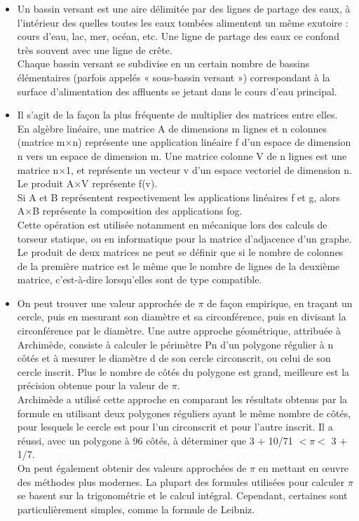 \begin{itemize}

	\item Un bassin versant\cite{ref17} est une aire délimitée par des lignes de partage des eaux, à l'intérieur des quelles toutes les eaux tombées alimentent un même exutoire : cours d'eau, lac, mer, océan, etc. Une ligne de partage des eaux ce confond très souvent avec une ligne de crête.\\

	Chaque bassin versant se subdivise en un certain nombre de bassins élémentaires (parfois appelés « sous-bassin versant ») correspondant à la surface d'alimentation des affluents se jetant dans le cours d'eau principal.\\

	\item Il s'agit de la façon la plus fréquente de multiplier des matrices\cite{ref18} entre elles.\\
	En algèbre linéaire, une matrice A de dimensions m lignes et n colonnes (matrice m×n) représente une application linéaire f d'un espace de dimension n vers un espace de dimension m. Une matrice colonne V de n lignes est une matrice n×1, et représente un vecteur v d'un espace vectoriel de dimension n. Le produit A×V représente f(v).\\
	Si A et B représentent respectivement les applications linéaires f et g, alors A×B représente la composition des applications fog.\\
	Cette opération est utilisée notamment en mécanique lors des calculs de torseur statique, ou en informatique pour la matrice d'adjacence d'un graphe. \\
	Le produit de deux matrices ne peut se définir que si le nombre de colonnes de la première matrice est le même que le nombre de lignes de la deuxième matrice, c'est-à-dire lorsqu'elles sont de type compatible.\\

	\item  On peut trouver une valeur approchée de $\pi$ \cite{ref19} de façon empirique, en traçant un cercle, puis en mesurant son diamètre et sa circonférence, puis en divisant la circonférence par le diamètre. Une autre approche géométrique, attribuée à Archimède, consiste à calculer le périmètre Pn d’un polygone régulier à n côtés et à mesurer le diamètre d de son cercle circonscrit, ou celui de son cercle inscrit. Plus le nombre de côtés du polygone est grand, meilleure est la précision obtenue pour la valeur de $\pi$.\\
	Archimède a utilisé cette approche en comparant les résultats obtenus par la formule en utilisant deux polygones réguliers ayant le même nombre de côtés, pour lesquels le cercle est pour l’un circonscrit et pour l’autre inscrit. Il a réussi, avec un polygone à 96 côtés, à déterminer que 3 + 10/71 $< \pi <$ 3 + 1/7.\\
	On peut également obtenir des valeurs approchées de $\pi$ en mettant en œuvre des méthodes plus modernes. La plupart des formules utilisées pour calculer $\pi$ se basent sur la trigonométrie et le calcul intégral. Cependant, certaines sont particulièrement simples, comme la formule de Leibniz.\\


\end{itemize}
